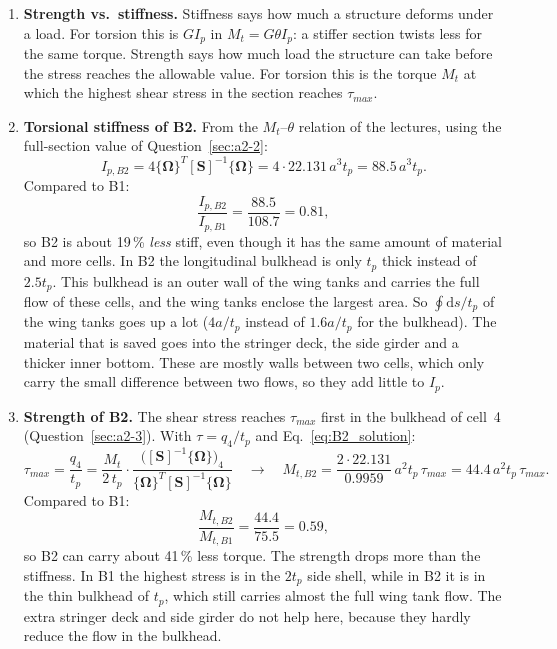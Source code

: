 \begin{enumerate}[label=\alph*., leftmargin=*]
  \item \textbf{Strength vs.\ stiffness.}
  Stiffness says how much a structure deforms under a load. For torsion this is $GI_p$ in $M_t = G\theta I_p$: a stiffer section twists less for the same torque. Strength says how much load the structure can take before the stress reaches the allowable value. For torsion this is the torque $M_t$ at which the highest shear stress in the section reaches $\tau_{max}$.

  \item \textbf{Torsional stiffness of B2.}
  From the $M_t$--$\theta$ relation of the lectures, using the full-section value of Question~\ref{sec:a2-2}:
  \begin{equation}
    I_{p,B2} = 4\{\boldsymbol{\Omega}\}^T[\mathbf{S}]^{-1}\{\boldsymbol{\Omega}\}
             = 4\cdot22.131\,a^3t_p = 88.5\,a^3t_p .
  \end{equation}
  Compared to B1:
  \begin{equation}
    \frac{I_{p,B2}}{I_{p,B1}} = \frac{88.5}{108.7} = 0.81 ,
  \end{equation}
  so B2 is about 19\,\% \emph{less} stiff, even though it has the same amount of material and more cells. In B2 the longitudinal bulkhead is only $t_p$ thick instead of $2.5t_p$. This bulkhead is an outer wall of the wing tanks and carries the full flow of these cells, and the wing tanks enclose the largest area. So $\oint\mathrm{d}s/t_p$ of the wing tanks goes up a lot ($4a/t_p$ instead of $1.6a/t_p$ for the bulkhead). The material that is saved goes into the stringer deck, the side girder and a thicker inner bottom. These are mostly walls between two cells, which only carry the small difference between two flows, so they add little to $I_p$.

  \item \textbf{Strength of B2.}
  The shear stress reaches $\tau_{max}$ first in the bulkhead of cell~4 (Question~\ref{sec:a2-3}). With $\tau = q_4/t_p$ and Eq.~\eqref{eq:B2_solution}:
  \begin{equation}
    \tau_{max} = \frac{q_4}{t_p}
    = \frac{M_t}{2\,t_p}\cdot
      \frac{\big([\mathbf{S}]^{-1}\{\boldsymbol{\Omega}\}\big)_4}
           {\{\boldsymbol{\Omega}\}^T[\mathbf{S}]^{-1}\{\boldsymbol{\Omega}\}}
    \quad\rightarrow\quad
    M_{t,B2} = \frac{2\cdot22.131}{0.9959}\,a^2t_p\,\tau_{max}
             = 44.4\,a^2t_p\,\tau_{max} .
  \end{equation}
  Compared to B1:
  \begin{equation}
    \frac{M_{t,B2}}{M_{t,B1}} = \frac{44.4}{75.5} = 0.59 ,
  \end{equation}
  so B2 can carry about 41\,\% less torque. The strength drops more than the stiffness. In B1 the highest stress is in the $2t_p$ side shell, while in B2 it is in the thin bulkhead of $t_p$, which still carries almost the full wing tank flow. The extra stringer deck and side girder do not help here, because they hardly reduce the flow in the bulkhead.
\end{enumerate}

